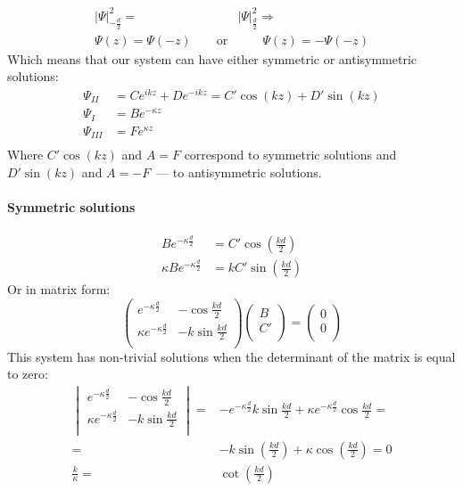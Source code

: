 			\begin{align}
				|\Psi|^2_{-\frac{d}{2}} =& |\Psi|^2_{\frac{d}{2}} \Rightarrow\\
				\Psi(z) = \Psi(-z) \qquad\text{or}&\qquad \Psi(z) = -\Psi(-z)
			\end{align}
			Which means that our system can have either symmetric or antisymmetric solutions:
			\begin{align}
				\Psi_{II}& = C e^{ikz} + D e^{-ikz} = C' \cos(kz) + D' \sin(kz) \\
				\Psi_{I}& = B e^{-\kappa z} \\
				\Psi_{III}& = F e^{\kappa z} \\		
			\end{align}
			Where $C'\cos(kz)$ and $A=F$ correspond to symmetric solutions and $D' \sin(kz)$ and $A = -F$~--- to antisymmetric solutions.
			
			\paragraph{Symmetric solutions}
				
				\begin{align}
					Be^{-\kappa \frac{d}{2}} &= C' \cos(\frac{kd}{2}) \\
					\kappa Be^{-\kappa \frac{d}{2}} &= kC' \sin(\frac{kd}{2})			
				\end{align}
				Or in matrix form:
				\begin{equation}
				\begin{pmatrix}
				e^{-\kappa \frac{d}{2}}			&	-\cos{\frac{kd}{2}}	\\ 
				\kappa e^{-\kappa \frac{d}{2}}	&	-k\sin{\frac{kd}{2}}	\\
				\end{pmatrix}
				\begin{pmatrix}
				B \\
				C' \\
				\end{pmatrix}
				=
				\begin{pmatrix}
				0 \\
				0 \\
				\end{pmatrix}			
				\end{equation}
				This system has non-trivial solutions when the determinant of the matrix is equal to zero:
				\begin{align}
					\begin{vmatrix}
						e^{-\kappa \frac{d}{2}}			&	-\cos{\frac{kd}{2}}	\\ 
						\kappa e^{-\kappa \frac{d}{2}}	&	-k\sin{\frac{kd}{2}}	\\
					\end{vmatrix}
					=& -e^{-\kappa\frac{d}{2}} k\sin{\frac{kd}{2}} + \kappa e^{-\kappa \frac{d}{2}} \cos{\frac{kd}{2}} =\\
					=& -k\sin(\frac{kd}{2}) + \kappa\cos(\frac{kd}{2}) = 0 \\
					\frac{k}{\kappa} =& \cot(\frac{kd}{2}) \label{symtranceq}
				\end{align}
				
